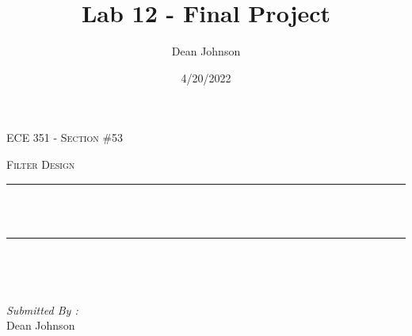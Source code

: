 \documentclass[12pt]{report}
\title{Lab 12 - Final Project}
\author{ Dean Johnson}
\date{4/20/2022}
\makeatletter
\let\thetitle\@title
\makeatother
\begin{document}

\begin{titlepage}
	\centering
    \vspace*{0.5 cm}
\begin{center}    \textsc{\Large   ECE 351 - Section \#53 }\\[2.0 cm]	\end{center}%
	\textsc{\Large Filter Design}\\[0.5 cm]				%
	\rule{\linewidth}{0.2 mm} \\[0.4 cm]
	{ \huge \bfseries \thetitle}\\
	\rule{\linewidth}{0.2 mm} \\[1.5 cm]
	
	\begin{minipage}{0.4\textwidth}
		\begin{flushleft} \large
			\end{flushleft}
			\end{minipage}~
			\begin{minipage}{0.4\textwidth}
            
			\begin{flushright} \large
			\emph{Submitted By :} \\
			Dean Johnson  
		\end{flushright}
           
	\end{minipage}\\[2 cm]
	
    
    
    
    
	
\end{titlepage}


\tableofcontents
\pagebreak

\renewcommand{\thesection}{\arabic{section}}
\end{document}
